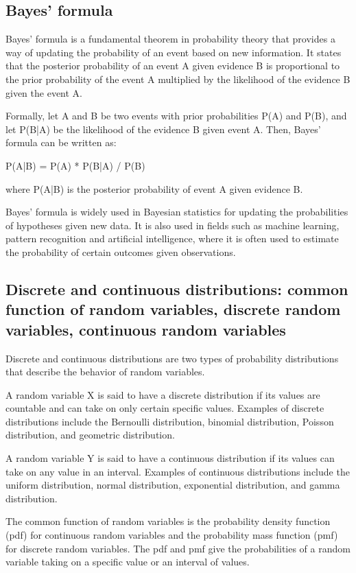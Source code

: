 \documentclass[12pt, a4paper, oneside]{article}
\begin{document}
\subsection{ Bayes’ formula }
Bayes' formula is a fundamental theorem in probability theory that provides a way of updating the probability of an event based on new information. It states that the posterior probability of an event A given evidence B is proportional to the prior probability of the event A multiplied by the likelihood of the evidence B given the event A.

Formally, let A and B be two events with prior probabilities P(A) and P(B), and let P(B|A) be the likelihood of the evidence B given event A. Then, Bayes' formula can be written as:

P(A|B) = P(A) * P(B|A) / P(B)

where P(A|B) is the posterior probability of event A given evidence B.

Bayes' formula is widely used in Bayesian statistics for updating the probabilities of hypotheses given new data. It is also used in fields such as machine learning, pattern recognition and artificial intelligence, where it is often used to estimate the probability of certain outcomes given observations.

\subsection{ Discrete and continuous distributions: common function of random variables, discrete random variables, continuous random variables   }
Discrete and continuous distributions are two types of probability distributions that describe the behavior of random variables.

A random variable X is said to have a discrete distribution if its values are countable and can take on only certain specific values. Examples of discrete distributions include the Bernoulli distribution, binomial distribution, Poisson distribution, and geometric distribution.

A random variable Y is said to have a continuous distribution if its values can take on any value in an interval. Examples of continuous distributions include the uniform distribution, normal distribution, exponential distribution, and gamma distribution.

The common function of random variables is the probability density function (pdf) for continuous random variables and the probability mass function (pmf) for discrete random variables. The pdf and pmf give the probabilities of a random variable taking on a specific value or an interval of values.
\end{document}
